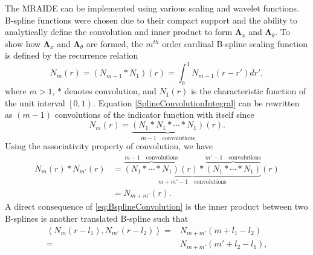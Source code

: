 \documentclass[journal]{IEEEtran}
\begin{document}
The MRAIDE can be implemented using various scaling and wavelet functions. B-spline functions were chosen due to their compact support and the ability to analytically define the convolution and inner product to form $\boldsymbol\Lambda_x$ and $\boldsymbol \Lambda_{\theta}$. To show how $\boldsymbol\Lambda_x$ and $\boldsymbol \Lambda_{\theta}$ are formed, the $m^{th}$ order cardinal B-spline scaling function is defined by the recurrence relation \cite{Chui1992} 
\begin{equation}
N_{m}\left(r\right) = \left(N_{m-1}\ast N_{1}\right)\left(r\right) = \int_0^{1} N_{m-1}\left( r-r'\right)dr',
\label{SplineConvolutionIntegral}
\end{equation}
where $m>1$, $\ast$ denotes convolution, and $N_1\left(r\right)$ is the characteristic function of the unit interval $\left[ 0,1\right)$.
Equation \eqref{SplineConvolutionIntegral} can be rewritten as $(m-1)$ convolutions of the indicator function with itself since
\begin{equation}
 N_{m}\left(r\right)=\underbrace{\left(N_{1}\ast N_{1}\ast \cdots \ast N_{1}\right)}_{m-1\quad \text{convolutions}}\left(r\right).
\end{equation}
Using the associativity property of convolution, we have
\setlength{\arraycolsep}{0.0em}
\begin{align}\label{eq:BsplineConvolution}
N_{m}\left( r\right) \ast N_{m'}\left(r\right)&=\underbrace{\overbrace{\left(N_{1} \ast \cdots \ast N_{1}\right)}^{m-1 \quad \text{convolutions}}\left(r\right) \ast \overbrace{\left(N_{1} \ast \cdots \ast N_{1}\right)}^{m'-1\quad \text{convolutions}}}_{m+m'-1 \quad \text{convolutions}}\left(r\right)\nonumber\\
&=N_{m+m'}\left(r\right).
\end{align}
A direct consequence of \eqref{eq:BsplineConvolution} is the inner product between two B-splines is another translated B-spline such that
\begin{align}
 \left\langle N_{m}\left(r-l_{1}\right), N_{m'}\left(r-l_{2}\right)\right\rangle=&N_{m+m'}\left(m+l_{1}-l_{2}\right)\nonumber \\
=&N_{m+m'}\left(m'+l_{2}-l_{1}\right),
\label{eq:BsplineInnerProduct}
\end{align}
\end{document}
